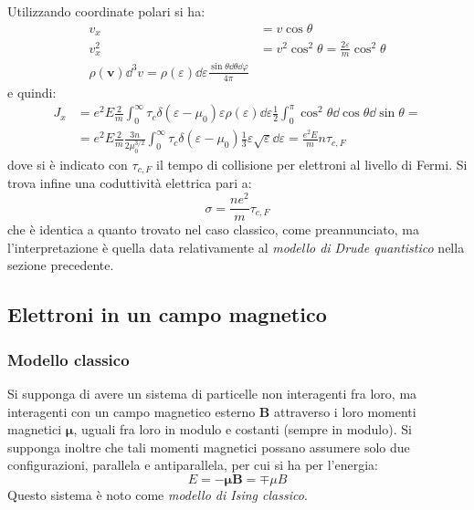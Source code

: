 Utilizzando coordinate polari si ha:
\begin{align*}
v_x &= v \cos \theta\\
v_x^2 &= v^2 \cos^2 \theta = \frac{2 \varepsilon}{m} \cos^2 \theta\\
\rho(\textbf{v}) \dd^3 v = \rho(\varepsilon) \dd \varepsilon \frac{\sin \theta \dd \theta \dd \varphi}{4\pi}
\end{align*}
e quindi:
\begin{align*}
J_x &= e^2 E \frac{2}{m} \int_0^\infty \tau_c \delta (\varepsilon - \mu_0) \varepsilon \rho(\varepsilon) \dd \varepsilon \frac{1}{2} \int_0^\pi \cos^2 \theta \dd \cos\theta \dd \sin\theta =\\
&= e^2 E \frac{2}{m} \frac{3n}{2 \mu_0^{3/2}} \int_0^\infty \tau_c \delta (\varepsilon - \mu_0) \frac{1}{3} \varepsilon \sqrt{\varepsilon} \dd \varepsilon = \frac{e^2 E}{m} n \tau_{c,F}
\end{align*}
dove si è indicato con $ \tau_{c,F} $ il tempo di collisione per elettroni al livello di Fermi. Si trova infine una coduttività elettrica pari a:
\begin{equation*}
\sigma = \frac{n e^2}{m} \tau_{c,F}
\end{equation*}
che è identica a quanto trovato nel caso classico, come preannunciato, ma l'interpretazione è quella data relativamente al \textit{modello di Drude quantistico} nella sezione precedente.

\subsection{Elettroni in un campo magnetico}

\subsubsection{Modello classico}

Si supponga di avere un sistema di particelle non interagenti fra loro, ma interagenti con un campo magnetico esterno $ \textbf{B} $ attraverso i loro momenti magnetici $ \bm{\mu} $, uguali fra loro in modulo e costanti (sempre in modulo). Si supponga inoltre che tali momenti magnetici possano assumere solo due configurazioni, parallela e antiparallela, per cui si ha per l'energia:
\begin{equation*}
E = - \bm{\mu}\textbf{B} = \mp \mu B
\end{equation*}
Questo sistema è noto come \textit{modello di Ising classico}.

